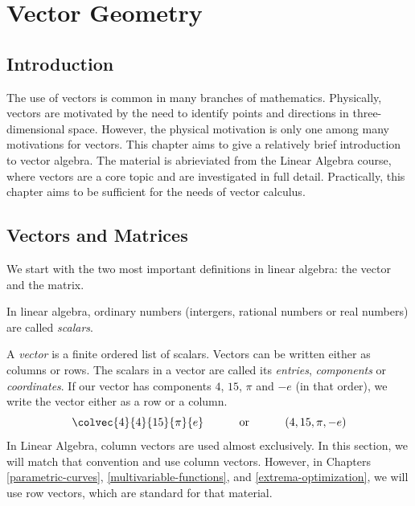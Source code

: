 \documentclass[fleqn,letterpaper]{report}
\begin{document}
\chapter{Vector Geometry}
\label{vector-geometry}

\section{Introduction}
\label{vector-geometry-introduction}

The use of vectors is common in many branches of mathematics.
Physically, vectors are motivated by the need to identify
points and directions in three-dimensional space. However, the
physical motivation is only one among many motivations for
vectors. This chapter aims to give a relatively brief
introduction to vector algebra. The material is abrieviated
from the Linear Algebra course, where vectors are a core topic
and are investigated in full detail. Practically, this
chapter aims to be sufficient for the needs of vector
calculus.

\section{Vectors and Matrices}
\label{vectors-and-matrices}

We start with the two most important definitions in linear
algebra: the vector and the matrix.

\begin{defn}
In linear algebra, ordinary numbers (intergers, rational
numbers or real numbers) are called \emph{scalars}.
\end{defn}

\begin{defn}
A \emph{vector} is a finite ordered list of scalars. Vectors
can be written either as columns or rows. The scalars in a
vector are called its \emph{entries}, \emph{components} or
\emph{coordinates}. If our vector has components $4$, $15$,
$\pi$ and $-e$ (in that order), we write the vector either as
a row or a column.
\begin{displaymath}
\colvec{4}{4}{15}{\pi}{e} \hspace{1cm} \text{ or }
\hspace{1cm} (4, 15, \pi, -e)
\end{displaymath}
In Linear Algebra, column vectors are used almost exclusively.
In this section, we will match that convention and use column
vectors. However, in Chapters \ref{parametric-curves},
\ref{multivariable-functions}, and \ref{extrema-optimization},
we will use row vectors, which are standard for that material. 
\end{defn}
\end{document}
